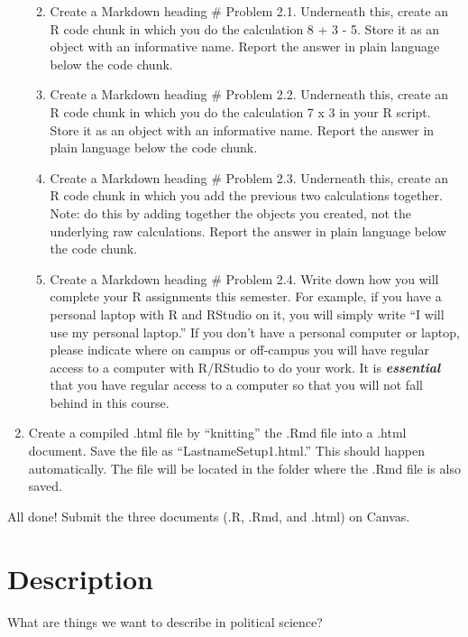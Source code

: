 \documentclass[
  letterpaper,
  DIV=11,
  numbers=noendperiod]{scrreprt}
\providecommand{\tightlist}{%
  \setlength{\itemsep}{0pt}\setlength{\parskip}{0pt}}\usepackage{longtable,booktabs,array}
\begin{document}
\begin{enumerate}
  \begin{enumerate}
  \def\labelenumii{\arabic{enumii}.}
  \tightlist
  \item
    Create a Markdown heading \# Problem 2.1. Underneath this, create an
    R code chunk in which you do the calculation 8 + 3 - 5. Store it as
    an object with an informative name. Report the answer in plain
    language below the code chunk.
  \item
    Create a Markdown heading \# Problem 2.2. Underneath this, create an
    R code chunk in which you do the calculation 7 x 3 in your R script.
    Store it as an object with an informative name. Report the answer in
    plain language below the code chunk.
  \item
    Create a Markdown heading \# Problem 2.3. Underneath this, create an
    R code chunk in which you add the previous two calculations
    together. Note: do this by adding together the objects you created,
    not the underlying raw calculations. Report the answer in plain
    language below the code chunk.
  \item
    Create a Markdown heading \# Problem 2.4. Write down how you will
    complete your R assignments this semester. For example, if you have
    a personal laptop with R and RStudio on it, you will simply write
    ``I will use my personal laptop.'' If you don't have a personal
    computer or laptop, please indicate where on campus or off-campus
    you will have regular access to a computer with R/RStudio to do your
    work. It is \textbf{\emph{essential}} that you have regular access
    to a computer so that you will not fall behind in this course.
  \end{enumerate}
\item
  Create a compiled .html file by ``knitting'' the .Rmd file into a
  .html document. Save the file as ``LastnameSetup1.html.'' This should
  happen automatically. The file will be located in the folder where the
  .Rmd file is also saved.
\end{enumerate}

All done! Submit the three documents (.R, .Rmd, and .html) on Canvas.


\hypertarget{description}{%
\chapter{Description}\label{description}}

What are things we want to describe in political science?
\end{document}

